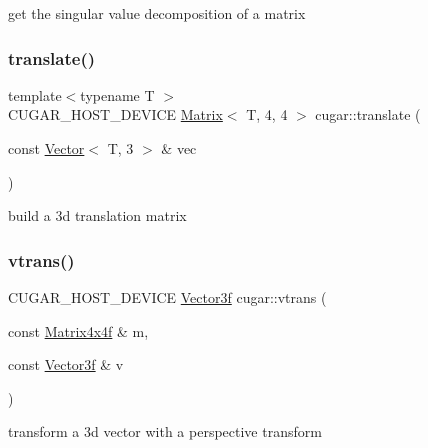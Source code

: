 get the singular value decomposition of a matrix \mbox{\label{group___matrices_module_ga85a3c0cf9bdf6ef3fc3f957499b875e1}} 
\subsubsection{\texorpdfstring{translate()}{translate()}}
{\footnotesize\ttfamily template$<$typename T $>$ \\
C\+U\+G\+A\+R\+\_\+\+H\+O\+S\+T\+\_\+\+D\+E\+V\+I\+CE \hyperlink{structcugar_1_1_matrix}{Matrix}$<$ T, 4, 4 $>$ cugar\+::translate (\begin{DoxyParamCaption}\item[{const \hyperlink{structcugar_1_1_vector}{Vector}$<$ T, 3 $>$ \&}]{vec }\end{DoxyParamCaption})}

build a 3d translation matrix \mbox{\label{group___matrices_module_ga1e73a0b256562dbf294f67516fcce100}} 
\subsubsection{\texorpdfstring{vtrans()}{vtrans()}}
{\footnotesize\ttfamily C\+U\+G\+A\+R\+\_\+\+H\+O\+S\+T\+\_\+\+D\+E\+V\+I\+CE \hyperlink{structcugar_1_1_vector}{Vector3f} cugar\+::vtrans (\begin{DoxyParamCaption}\item[{const \hyperlink{structcugar_1_1_matrix}{Matrix4x4f} \&}]{m,  }\item[{const \hyperlink{structcugar_1_1_vector}{Vector3f} \&}]{v }\end{DoxyParamCaption})\hspace{0.3cm}{\ttfamily [inline]}}

transform a 3d vector with a perspective transform 